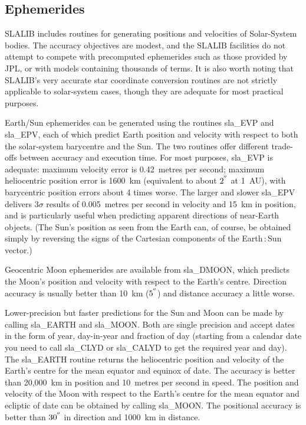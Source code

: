 \documentclass[11pt,twoside]{article}
\newcommand{\arcseci}[1] {$#1\hspace{-0.05em}$\raisebox{-0.5ex}
                         {$^{'\hspace{-0.1em}'}$}}
\renewcommand{\arcseci}[1] {$#1\hspace{-0.05em}^{'\hspace{-0.1em}'}$}
\begin{document}
\label{ephem}
\subsection{Ephemerides}
SLALIB includes routines for generating positions and
velocities of Solar-System bodies.  The accuracy objectives are
modest, and the SLALIB facilities do not attempt
to compete with precomputed ephemerides such as
those provided by JPL, or with models containing
thousands of terms.  It is also worth noting
that SLALIB's very accurate star coordinate conversion
routines are not strictly applicable to solar-system cases,
though they are adequate for most practical purposes.

Earth/Sun ephemerides can be generated using the routines
sla\_EVP and
sla\_EPV,
each of which predict Earth position and velocity with respect to both the
solar-system barycentre and the
Sun.  The two routines offer different trade-offs between
accuracy and execution time.  For most purposes,
sla\_EVP is adequate:
maximum velocity error is 0.42~metres per second;  maximum
heliocentric position error is 1600~km (equivalent to
about \arcseci{2} at 1~AU), with
barycentric position errors about 4 times worse.
The larger and slower
sla\_EPV
delivers $3\sigma$ results of 0.005~metres per second in velocity
and 15~km in position, and is particularly useful when predicting
apparent directions of near-Earth objects.
(The Sun's position as
seen from the Earth can, of course, be obtained simply by
reversing the signs of the Cartesian components of the
Earth\,:\,Sun vector.)

Geocentric Moon ephemerides are available from
sla\_DMOON,
which predicts the Moon's position and velocity with respect to
the Earth's centre.  Direction accuracy is usually better than
10~km (\arcseci{5}) and distance accuracy a little worse.

Lower-precision but faster predictions for the Sun and Moon
can be made by calling
sla\_EARTH
and
sla\_MOON.
Both are single precision and accept dates in the form of
year, day-in-year and fraction of day
(starting from a calendar date you need to call
sla\_CLYD
or
sla\_CALYD
to get the required year and day).
The
sla\_EARTH
routine returns the heliocentric position and velocity
of the Earth's centre for the mean equator and
equinox of date.  The accuracy is better than 20,000~km in position
and 10~metres per second in speed.
The
position and velocity of the Moon with respect to the
Earth's centre for the mean equator and ecliptic of date
can be obtained by calling
sla\_MOON.
The positional accuracy is better than \arcseci{30} in direction
and 1000~km in distance.
\end{document}
